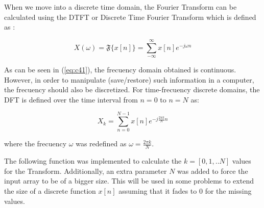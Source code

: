 When we move into a discrete time domain, the Fourier Transform can be calculated
using the DTFT or Discrete Time Fourier Transform
which is defined as \cite{kamen2000fundamentals}:

\begin{equation}
X(\omega) = \mathfrak{F}\{ x[n] \} = \displaystyle\sum_{- \infty}^{\infty} x[n] e^{-j \omega n}
\label{eq:c41}
\end{equation} 

As can be seen in (\ref{eq:c41}), the frecuency domain obtained is continuous. 
However, in order to manipulate (save/restore) such information in a computer,
the frecuency should also be discretized.
For time-frecuency discrete domains, the DFT is defined over the
time interval from $n=0$ to $n=N$ as:

\begin{equation}
X_k = \displaystyle\sum_{n=0}^{N-1} x[n] e^{-j \frac{2 \pi k}{N} n}
\label{eq:c42}
\end{equation} 

where the frecuency $\omega$ was redefined as $\omega = \frac{2 \pi k}{N}$.

The following function was implemented to calculate the $k = [0,1,..N]$
values for the Transform. Additionally, an extra parameter
$N$ was added to force the input array to be of a bigger size.
This will be used in some problems to extend the size of a discrete
function $x[n]$ assuming that it fades to 0 for the missing values.


